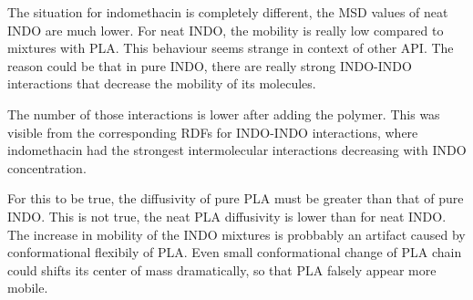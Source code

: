 The situation for indomethacin is completely different, the MSD values of neat INDO are much lower. For neat INDO, the mobility is really low compared to mixtures with PLA. This behaviour seems strange in context of other API. The reason could be that in pure INDO, there are really strong INDO-INDO interactions that decrease the mobility of its molecules. 

The number of those interactions is lower after adding the polymer. This was visible from the corresponding RDFs for INDO-INDO interactions, where indomethacin had the strongest intermolecular interactions decreasing with INDO concentration. 

For this to be true, the diffusivity of pure PLA must be greater than that of pure INDO. This is not true, the neat PLA diffusivity is lower than for neat INDO. The increase in mobility of the INDO mixtures is probbably an artifact caused by conformational flexibily of PLA. Even small conformational change of PLA chain could shifts its center of mass dramatically, so that PLA falsely appear more mobile.  

